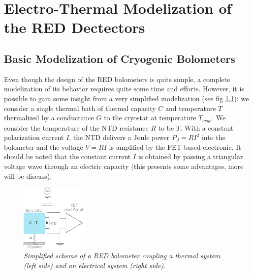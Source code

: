 
\chapter{Electro-Thermal Modelization of the RED Dectectors}

\label{ChapterEthem} %


\section{Basic Modelization of Cryogenic Bolometers}

Even though the design of the RED bolometers is quite simple, a complete modelization of its behavior requires quite some time and efforts. However, it is possible to gain some insight from a very simplified modelization (see fig \ref{bolo-model}): we consider a single thermal bath of thermal capacity $C$ and temperature $T$ thermalized by a conductance $G$ to the cryostat at temperature $T_{cryo}$. We consider the temperature of the NTD resistance $R$ to be $T$. With a constant polarization current $I$, the NTD delivers a Joule power $P_J = RI^2$ into the bolometer and the voltage $V=RI$ is amplified by the FET-based electronic. It should be noted that the constant current $I$ is obtained by passing a triangular voltage wave through an electric capacity (this presents some advantages, more will be discuss).

\begin{figure}
\centering
\captionsetup{justification=centering}
\includegraphics[width=0.3\textwidth]{graphics/bolo_simple.pdf}
\caption{\label{bolo-model} \em Simplified scheme of a RED bolometer coupling a thermal system (left side) and an electrical system (right side). }
\end{figure}

